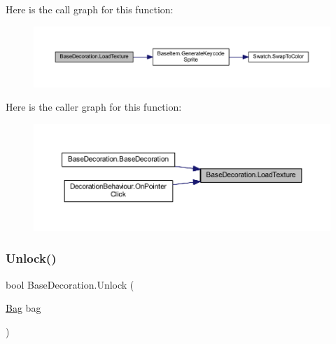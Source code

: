 Here is the call graph for this function\+:
\nopagebreak
\begin{figure}[H]
\begin{center}
\leavevmode
\includegraphics[width=350pt]{class_base_decoration_aafdc27ba3ede4f9eadc66e8dd6fa9b1a_cgraph}
\end{center}
\end{figure}
Here is the caller graph for this function\+:
\nopagebreak
\begin{figure}[H]
\begin{center}
\leavevmode
\includegraphics[width=350pt]{class_base_decoration_aafdc27ba3ede4f9eadc66e8dd6fa9b1a_icgraph}
\end{center}
\end{figure}
\mbox{\label{class_base_decoration_a820de02d0bb917f7cee59a4759da6251}} 
\subsubsection{\texorpdfstring{Unlock()}{Unlock()}}
{\footnotesize\ttfamily bool Base\+Decoration.\+Unlock (\begin{DoxyParamCaption}\item[{\mbox{\hyperlink{class_bag}{Bag}}}]{bag }\end{DoxyParamCaption})}

